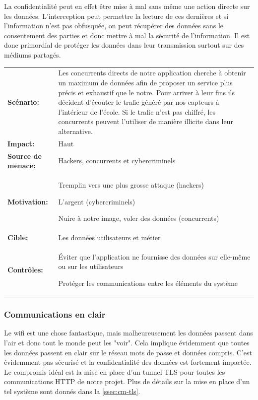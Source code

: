 \documentclass[12pt]{article}
\begin{document}
La confidentialité peut en effet être mise à mal sans même une action directe sur les données. L'interception peut permettre la lecture de ces dernières et si l'information n'est pas obfusquée, on peut récupérer des données sans le consentement des parties et donc mettre à mal la sécurité de l'information. Il est donc primordial de protéger les données dans leur transmission surtout sur des médiums partagés.
\medskip

\renewcommand{\arraystretch}{1.6}
\begin{tabular}{@{}p{4cm}p{12cm}}
\textbf{Scénario:} &  Les concurrents directs de notre application cherche à obtenir un maximum de données afin de proposer un service plus précis et exhaustif que le notre. Pour arriver à leur fins ils décident d'écouter le trafic généré par nos capteurs à l'intérieur de l'école. Si le trafic n'est pas chiffré, les concurrents peuvent l'utiliser de manière illicite dans leur alternative.\\
\textbf{Impact:} & Haut \\
\textbf{Source de menace: } & Hackers, concurrents et cybercriminels \\
\textbf{Motivation:} & Tremplin vers une plus grosse attaque (hackers)

L'argent (cybercriminels)

Nuire à notre image, voler des données (concurrents)\\
\textbf{Cible:} & Les données utilisateurs et métier \\
\textbf{Contrôles:} & Éviter que l'application ne fournisse des données sur elle-même ou sur les utilisateurs

Protéger les communications entre les éléments du système
\end{tabular}
\renewcommand{\arraystretch}{1}

\subsubsection{Communications en clair}

Le wifi est une chose fantastique, mais malheureusement les données passent dans l'air et donc tout le monde peut les "voir". Cela implique évidemment que toutes les données passent en clair sur le réseau mots de passe et données compris. C'est évidemment pas sécurisé et la confidentialité des données est fortement impactée. Le compromis idéal est la mise en place d'un tunnel TLS pour toutes les communications HTTP de notre projet. Plus de détails sur la mise en place d'un tel système sont donnés dans la \autoref{ssec:cm-tls}.
\end{document}
